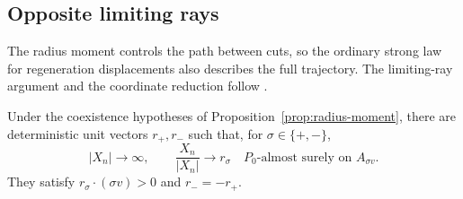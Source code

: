 \subsection{Opposite limiting rays}

The radius moment controls the path between cuts, so the ordinary
strong law for regeneration displacements also describes the full
trajectory.  The limiting-ray argument and the coordinate reduction
follow \cite[Section~4.1]{OpenAI2026}.

\begin{lemma}
\label{lem:opposite-rays}
Under the coexistence hypotheses of Proposition~\ref{prop:radius-moment},
there are deterministic unit vectors $r_+,r_-$ such that, for
$\sigma\in\{+,-\}$,
\[
  |X_n|\longrightarrow\infty,\qquad
  \frac{X_n}{|X_n|}\longrightarrow r_\sigma
  \quad P_0\text{-almost surely on }A_{\sigma v}.
\]
They satisfy $r_\sigma\cdot(\sigma v)>0$ and $r_-=-r_+$.
\end{lemma}

